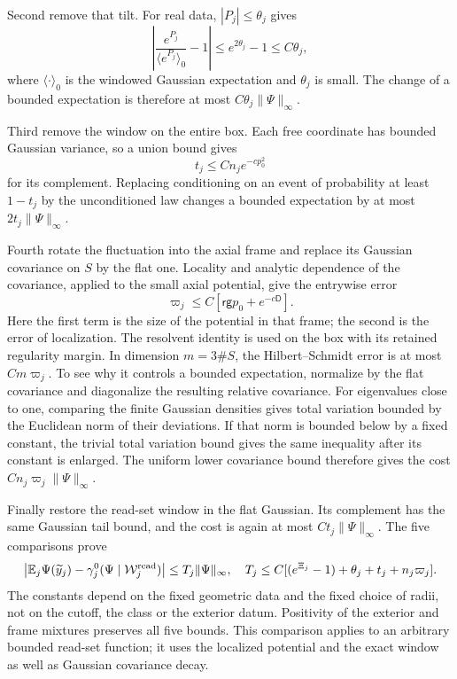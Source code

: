 \documentclass[11pt,letterpaper,reqno]{amsart}
\theoremstyle{definition}
\theoremstyle{remark}
\begin{document}
Second remove that tilt. For real data,
$|P_j|\le\theta_j$ gives
\[
 \left|\frac{e^{P_j}}{\langle e^{P_j}\rangle_0}-1\right|
                        \le e^{2\theta_j}-1\le C\theta_j,
\]
where $\langle\cdot\rangle_0$ is the windowed Gaussian
expectation and $\theta_j$ is small. The change of a bounded
expectation is therefore at most
$C\theta_j\|\Psi\|_\infty$.

Third remove the window on the entire box. Each free coordinate
has bounded Gaussian variance, so a union bound gives
\[
 t_j\le Cn_je^{-cp_0^2}
\]
for its complement. Replacing conditioning on an event of
probability at least $1-t_j$ by the unconditioned law changes
a bounded expectation by at most $2t_j\|\Psi\|_\infty$.

Fourth rotate the fluctuation into the axial frame and replace
its Gaussian covariance on $S$ by the flat one. Locality and
analytic dependence of the covariance, applied to the small
axial potential, give the entrywise error
\[
 \varpi_j\le C[\mathsf r\mathsf g p_0+e^{-c\mathsf D}].
\]
Here the first term is the size of the potential in that frame;
the second is the error of localization. The resolvent identity
is used on the box with its retained regularity margin. In
dimension $m=3\#S$, the Hilbert--Schmidt error is at most
$Cm\varpi_j$. To see why it controls a bounded expectation,
normalize by the flat covariance and diagonalize the resulting
relative covariance. For eigenvalues close to one, comparing
the finite Gaussian densities gives total variation bounded by
the Euclidean norm of their deviations. If that norm is bounded
below by a fixed constant, the trivial total variation bound
gives the same inequality after its constant is enlarged.
The uniform lower covariance bound therefore gives the cost
$Cn_j\varpi_j\|\Psi\|_\infty$.

Finally restore the read-set window in the flat Gaussian.
Its complement has the same Gaussian tail bound, and the cost
is again at most $Ct_j\|\Psi\|_\infty$. The five comparisons
prove
\begin{equation}\label{eq:inserted-read-comparison}
 \left|\mathbb E_j\Psi(\widetilde y_j)
              -\gamma_j^0(\Psi\mid\mathcal W_j^{\rm read})\right|
 \le T_j\|\Psi\|_\infty,
 \quad
 T_j\le C[(e^{\Xi_j}-1)+\theta_j+t_j+n_j\varpi_j].
\end{equation}
The constants depend on the fixed geometric data and the fixed
choice of radii, not on the cutoff, the class or the exterior
datum. Positivity of the exterior and frame mixtures preserves
all five bounds. This comparison applies to an arbitrary bounded
read-set function; it uses the localized potential and the exact
window as well as Gaussian covariance decay.
\end{document}
